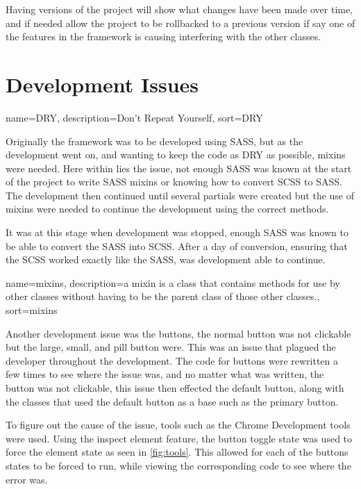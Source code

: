 Having versions of the project will show what changes have been made over time, and if needed allow the project to be rollbacked to a previous version if say one of the features in the framework is causing interfering with the other classes.


\newpage
\section*{Development Issues}

{
  name={DRY},
  description={Don't Repeat Yourself},
  sort=DRY
}

Originally the framework was to be developed using \gls{SASS}, but as the development went on, and wanting to keep the code as \gls{DRY} as possible, \gls{mixins} were needed. Here within lies the issue, not enough \gls{SASS} was known at the start of the project to write \gls{SASS} \gls{mixins} or knowing how to convert \gls{SCSS} to \gls{SASS}. The development then continued until several partials were created but the use of \gls{mixins} were needed to continue the development using the correct methods. 

It was at this stage when development was stopped, enough \gls{SASS} was known to be able to convert the \gls{SASS} into \gls{SCSS}. After a day of conversion, ensuring that the \gls{SCSS} worked exactly like the \gls{SASS}, was development able to continue. 

{
  name={mixins},
  description={a mixin is a class that contains methods for use by other classes without having to be the parent class of those other classes.},
  sort=mixins
}

Another development issue was the buttons, the normal button was not clickable but the large, small, and pill button were. This was an issue that plagued the developer throughout the development. The code for buttons were rewritten a few times to see where the issue was, and no matter what was written, the button was not clickable, this issue then effected the default button, along with the classes that used the default button as a base such as the primary button. 

To figure out the cause of the issue, tools such as the Chrome Development tools were used. Using the inspect element feature, the button toggle state was used to force the element state as seen in \ref{fig:tools}. This allowed for each of the buttons states to be forced to run, while viewing the corresponding code to see where the error was. 

